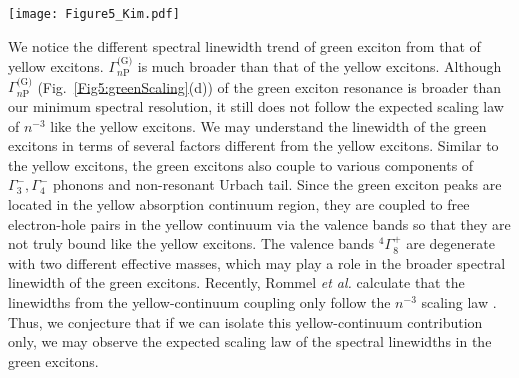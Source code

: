 \documentclass[aps,reprint,amsmath,amssymb,prb]{revtex4-1}
\begin{document}
\begin{figure*}[htbp]
\centering
\texttt{[image: Figure5\_Kim.pdf]}
\caption{Green P-exciton resonances at different temperatures:
(a) $E_{n\text{P}}^{\text{(G)}}$, excitation resonance energy, (b) $E_{\text{g}}^{\text{(G)}}-E_{n\text{P}}^{\text{(G)}}$, exciton binding energy, (c) $E_{n+1}^{\text{(G)}}-E_{n}^{\text{(G)}}$,
(d) $\Gamma_{n\text{P}}^{\text{(G)}}$, the Full-width at half-maximum of exciton peaks,
(e) $C_{n\text{P}}^{\text{(G)}}$, the peak areas of asymmetric Lorentzian peaks, and (f) the degree of asymmetry $Q_{n\text{P}}^{\text{(G)}}$ of exciton resonance. Red straight lines in (b), (c), (d), and (e) represent the theoretical scaling behavior as guidelines.}
\label{Fig5:greenScaling}
\end{figure*}

We notice the different spectral linewidth trend of green exciton from that of yellow excitons.  $\Gamma_{n\text{P}}^{\text{(G)}}$ is much broader than that of the yellow excitons. 
Although $\Gamma_{n\text{P}}^{\text{(G)}}$ (Fig.~\ref{Fig5:greenScaling}(d)) of the green exciton resonance is broader than our minimum spectral resolution, it still does not follow the expected scaling law of $n^{-3}$ like the yellow excitons. We may understand the linewidth of the green excitons in terms of several factors different from the yellow excitons. Similar to the yellow excitons, the green excitons also couple to various components of $\Gamma_3^-, \Gamma_4^-$ phonons and non-resonant Urbach tail. Since the green exciton peaks are located in the yellow absorption continuum region, they are coupled to free electron-hole pairs in the yellow continuum via the valence bands so that they are not truly bound like the yellow excitons. The valence bands $^4\Gamma_8^+$ are degenerate with two different effective masses, which may play a role in the broader spectral linewidth of the green excitons. Recently, Rommel \textit{et al.} calculate that the linewidths from the yellow-continuum coupling only follow the $n^{-3}$ scaling law \cite{Rommel2020}. Thus, we conjecture that if we can isolate this yellow-continuum contribution only, we may observe the expected scaling law of the spectral linewidths in the green excitons.
\end{document}
